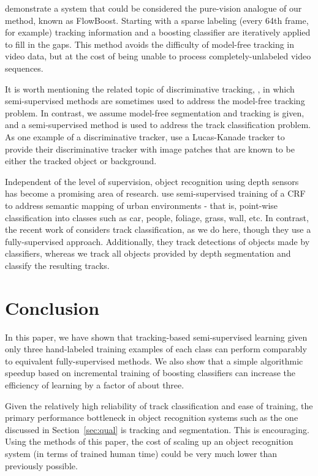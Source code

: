 \documentclass[conference]{IEEEtran}
\begin{document}
\citet{Ali2011} demonstrate a system that could be considered the pure-vision analogue of our method, known as FlowBoost.  Starting with a sparse labeling (every 64th frame, for example) tracking information and a boosting classifier are iteratively applied to fill in the gaps.  This method avoids the difficulty of model-free tracking in video data, but at the cost of being unable to process completely-unlabeled video sequences.

It is worth mentioning the related topic of discriminative tracking, \eg \cite{Kalal2010, Stalder2009, Tang2007}, in which semi-supervised methods are sometimes used to address the model-free tracking problem.  In contrast, we assume model-free segmentation and tracking is given, and a semi-supervised method is used to address the track classification problem.  As one example of a discriminative tracker, \citet{Kalal2010} use a Lucas-Kanade tracker to provide their discriminative tracker with image patches that are known to be either the tracked object or background.

Independent of the level of supervision, object recognition using depth sensors has become a promising area of research.  \citet{Douillard2010} use semi-supervised training of a CRF to address semantic mapping of urban environments - that is, point-wise classification into classes such as car, people, foliage, grass, wall, etc.  In contrast, the recent work of \citet{Spinello2010} considers track classification, as we do here, though they use a fully-supervised approach.  Additionally, they track detections of objects made by classifiers, whereas we track all objects provided by depth segmentation and classify the resulting tracks.

\section{Conclusion} 
\label{sec:conclusion}

In this paper, we have shown that tracking-based semi-supervised learning given only three hand-labeled training examples of each class can perform comparably to equivalent fully-supervised methods.  We also show that a simple algorithmic speedup based on incremental training of boosting classifiers can increase the efficiency of learning by a factor of about three.

Given the relatively high reliability of track classification and ease of training, the primary performance bottleneck in object recognition systems such as the one discussed in Section~\ref{sec:qual} is tracking and segmentation.  This is encouraging.  Using the methods of this paper, the cost of scaling up an object recognition system (in terms of trained human time) could be very much lower than previously possible.
\end{document}
